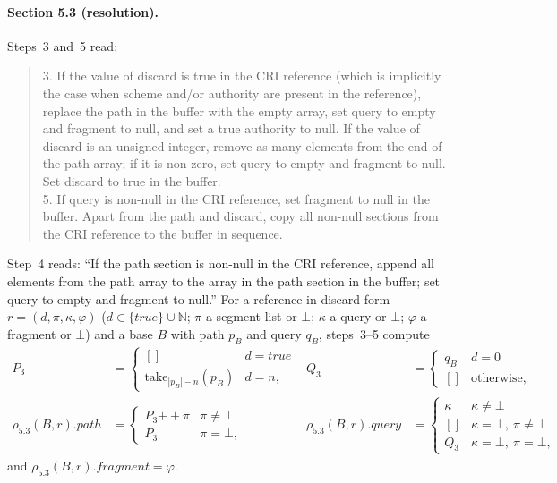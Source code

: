 \documentclass[11pt,a4paper]{article}
\theoremstyle{remark}
\newcommand{\take}[1]{\mathrm{take}_{#1}}
\newcommand{\res}{\rho_{5.3}}
\newcommand{\seq}[1]{[#1]}
\begin{document}
\paragraph{Section 5.3 (resolution).} Steps~3 and~5 read:
\begin{quote}\small
3. If the value of discard is true in the CRI reference (which is implicitly the case when scheme
and/or authority are present in the reference), replace the path in the buffer with the empty array,
set query to empty and fragment to null, and set a true authority to null. If the value of discard is
an unsigned integer, remove as many elements from the end of the path array; if it is non-zero, set
query to empty and fragment to null. Set discard to true in the buffer.\\[2pt]
5. If query is non-null in the CRI reference, set fragment to null in the buffer. Apart from the
path and discard, copy all non-null sections from the CRI reference to the buffer in sequence.
\end{quote}
Step~4 reads: ``If the path section is non-null in the CRI reference, append all elements from the path
array to the array in the path section in the buffer; set query to empty and fragment to null.''
For a reference in discard form $r=(d,\pi,\kappa,\varphi)$ ($d\in\{\mathit{true}\}\cup\mathbb{N}$;
$\pi$ a segment list or $\bot$; $\kappa$ a query or $\bot$; $\varphi$ a fragment or $\bot$) and a base
$B$ with path $p_B$ and query $q_B$, steps~3--5 compute
\begin{align*}
P_3&=\begin{cases}\seq{} & d=\mathit{true}\\ \take{|p_B|-n}(p_B) & d=n,\end{cases}
&Q_3&=\begin{cases} q_B & d=0\\ \seq{} & \text{otherwise,}\end{cases}\\
\res(B,r).\mathit{path}&=\begin{cases} P_3\mathbin{+\!\!+}\pi & \pi\neq\bot\\ P_3 & \pi=\bot,\end{cases}
&\res(B,r).\mathit{query}&=\begin{cases} \kappa & \kappa\neq\bot\\ \seq{} & \kappa=\bot,\ \pi\neq\bot\\ Q_3 & \kappa=\bot,\ \pi=\bot,\end{cases}
\end{align*}
and $\res(B,r).\mathit{fragment}=\varphi$.
\end{document}
